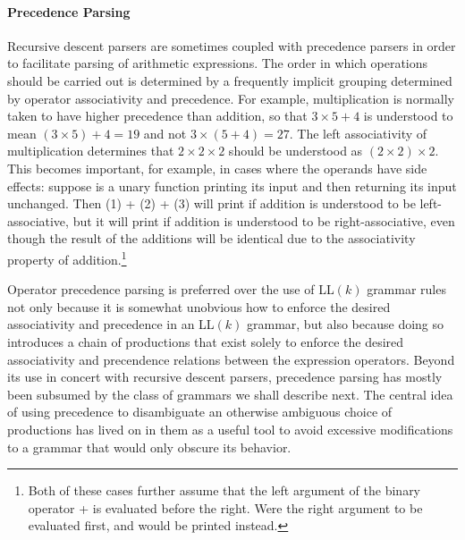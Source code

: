 \paragraph{Precedence Parsing}
Recursive descent parsers are sometimes coupled with precedence parsers in order to facilitate parsing of arithmetic expressions. The order in which operations should be carried out is determined by a frequently implicit grouping determined by operator associativity and precedence. For example, multiplication is normally taken to have higher precedence than addition, so that $3 \times 5 + 4$ is understood to mean $(3 \times 5) + 4 = 19$ and not $3 \times (5 + 4) = 27.$ The left associativity of multiplication determines that $2 \times 2 \times 2$ should be understood as $(2 \times 2) \times 2.$ This becomes important, for example, in cases where the operands have side effects: suppose  is a unary function printing its input and then returning its input unchanged. Then (1) + (2) + (3) will print  if addition is understood to be left-associative, but it will print  if addition is understood to be right-associative, even though the result of the additions will be identical due to the associativity property of addition.\footnote{Both of these cases further assume that the left argument of the binary operator + is evaluated before the right. Were the right argument to be evaluated first,  and  would be printed instead.}

Operator precedence parsing is preferred over the use of LL$(k)$ grammar rules not only because it is somewhat unobvious how to enforce the desired associativity and precedence in an LL$(k)$ grammar, but also because doing so introduces a chain of productions that exist solely to enforce the desired associativity and precendence relations between the expression operators. Beyond its use in concert with recursive descent parsers, precedence parsing has mostly been subsumed by the class of grammars we shall describe next. The central idea of using precedence to disambiguate an otherwise ambiguous choice of productions has lived on in them as a useful tool to avoid excessive modifications to a grammar that would only obscure its behavior.

